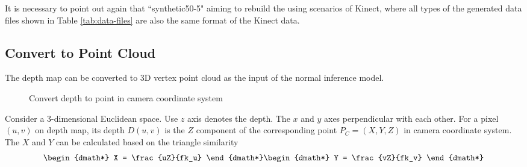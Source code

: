 \documentclass[border=15pt, multi, tikz]{article}
\begin{document}
It is necessary to point out again that ``synthetic50-5" aiming to rebuild the using scenarios of Kinect, where all types of the generated data files shown in Table \ref{tab:data-files} are also the same format of the Kinect data.



\subsection{Convert to Point Cloud}
\label{sec:depth-map-to-point-cloud}
The depth map can be converted to 3D vertex point cloud as the input of the normal inference model. 

\begin{figure}[h!]
	\centering
	\caption{Convert depth to point in camera coordinate system}
	\label{fig:depth-triangulation}
\end{figure}

Consider a 3-dimensional Euclidean space. Use $ z $ axis denotes the depth. The $ x  $ and $ y $ axes perpendicular with each other. For a pixel $ (u,v) $ on depth map, its depth $ D(u,v) $ is the $ Z $ component of the corresponding point $P_C = (X,Y,Z) $ in camera coordinate system. The $ X $ and $ Y $ can be calculated based on the triangle similarity
\begin{dgroup*}
	
	\begin{dmath*}
		X = \frac{uZ}{fk_u}
	\end{dmath*}
	\begin{dmath*}
		Y = \frac{vZ}{fk_v}
	\end{dmath*}
\end{dgroup*}
\end{document}
